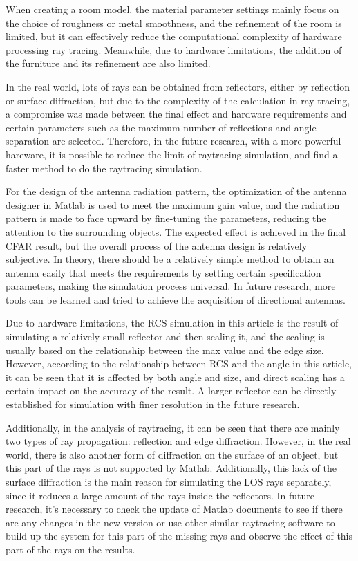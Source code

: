 \documentclass[12pt,DIV14,BCOR12mm,a4paper,footinclude=false,headinclude,parskip=half-,twoside,openright,cleardoublepage=empty,toc=index,bibliography=totoc,listof=totoc]{scrreprt}
\numberwithin{equation}{chapter}
\begin{document}
When creating a room model, the material parameter settings mainly focus on the choice of roughness or metal smoothness, and the refinement of the room is limited, but it can effectively reduce the computational complexity of hardware processing ray tracing. Meanwhile, due to hardware limitations, the addition of the furniture and its refinement are also limited.

In the real world, lots of rays can be obtained from reflectors, either by reflection or surface diffraction, but due to the complexity of the calculation in ray tracing, a compromise was made between the final effect and hardware requirements and certain parameters such as the maximum number of reflections and angle separation are selected. Therefore, in the future research, with a more powerful hareware, it is possible to reduce the limit of raytracing simulation, and find a faster method to do the raytracing simulation.

For the design of the antenna radiation pattern, the optimization of the antenna designer in Matlab is used to meet the maximum gain value, and the radiation pattern is made to face upward by fine-tuning the parameters, reducing the attention to the surrounding objects. The expected effect is achieved in the final CFAR result, but the overall process of the antenna design is relatively subjective. In theory, there should be a relatively simple method to obtain an antenna easily that meets the requirements by setting certain specification parameters, making the simulation process universal. In future research, more tools can be learned and tried to achieve the acquisition of directional antennas.

Due to hardware limitations, the RCS simulation in this article is the result of simulating a relatively small reflector and then scaling it, and the scaling is usually based on the relationship between the max value and the edge size. However, according to the relationship between RCS and the angle in this article, it can be seen that it is affected by both angle and size, and direct scaling has a certain impact on the accuracy of the result. A larger reflector can be directly established for simulation with finer resolution in the future research.

Additionally, in the analysis of raytracing, it can be seen that there are mainly two types of ray propagation: reflection and edge diffraction. However, in the real world, there is also another form of diffraction on the surface of an object, but this part of the rays is not supported by Matlab. Additionally, this lack of the surface diffraction is the main reason for simulating the LOS rays separately, since it reduces a large amount of the rays inside the reflectors. In future research, it's necessary to check the update of Matlab documents to see if there are any changes in the new version or use other similar raytracing software to build up the system for this part of the missing rays and observe the effect of this part of the rays on the results.
\end{document}
